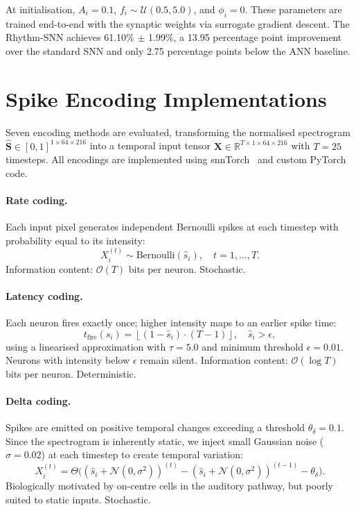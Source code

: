 At initialisation, $A_i = 0.1$, $f_i \sim \mathcal{U}(0.5, 5.0)$, and $\phi_i = 0$. These parameters are trained end-to-end with the synaptic weights via surrogate gradient descent. The Rhythm-SNN achieves 61.10\% $\pm$ 1.99\%, a 13.95 percentage point improvement over the standard SNN and only 2.75 percentage points below the ANN baseline.

\section{Spike Encoding Implementations}
\label{sec:encodings}

Seven encoding methods are evaluated, transforming the normalised spectrogram $\hat{\mathbf{S}} \in [0, 1]^{1 \times 64 \times 216}$ into a temporal input tensor $\mathbf{X} \in \mathbb{R}^{T \times 1 \times 64 \times 216}$ with $T = 25$ timesteps. All encodings are implemented using snnTorch~\citep{eshraghian2023training} and custom PyTorch code.

\paragraph{Rate coding.}
Each input pixel generates independent Bernoulli spikes at each timestep with probability equal to its intensity:
\begin{equation}
\label{eq:rate}
X_i^{(t)} \sim \text{Bernoulli}(\hat{s}_i), \quad t = 1, \ldots, T.
\end{equation}
Information content: $\mathcal{O}(T)$ bits per neuron. Stochastic.

\paragraph{Latency coding.}
Each neuron fires exactly once; higher intensity maps to an earlier spike time:
\begin{equation}
\label{eq:latency}
t_{\text{fire}}(\hat{s}_i) = \left\lfloor (1 - \hat{s}_i) \cdot (T - 1) \right\rfloor, \quad \hat{s}_i > \epsilon,
\end{equation}
using a linearised approximation with $\tau = 5.0$ and minimum threshold $\epsilon = 0.01$. Neurons with intensity below $\epsilon$ remain silent. Information content: $\mathcal{O}(\log T)$ bits per neuron. Deterministic.

\paragraph{Delta coding.}
Spikes are emitted on positive temporal changes exceeding a threshold $\theta_\delta = 0.1$. Since the spectrogram is inherently static, we inject small Gaussian noise ($\sigma = 0.02$) at each timestep to create temporal variation:
\begin{equation}
\label{eq:delta}
X_i^{(t)} = \Theta\!\bigl((\hat{s}_i + \mathcal{N}(0, \sigma^2))^{(t)} - (\hat{s}_i + \mathcal{N}(0, \sigma^2))^{(t-1)} - \theta_\delta\bigr).
\end{equation}
Biologically motivated by on-centre cells in the auditory pathway, but poorly suited to static inputs. Stochastic.


